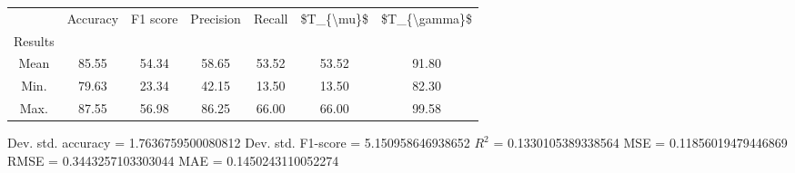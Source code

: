 \begin{tabular}{|c|c|c|c|c|c|c|}
\toprule
{} &  Accuracy &  F1 score &  Precision &  Recall &  \$T\_\{\textbackslash mu\}\$ &  \$T\_\{\textbackslash gamma\}\$ \\
Results &           &           &            &         &            &               \\
\hline
Mean    &     85.55 &     54.34 &      58.65 &   53.52 &      53.52 &         91.80 \\
Min.    &     79.63 &     23.34 &      42.15 &   13.50 &      13.50 &         82.30 \\
Max.    &     87.55 &     56.98 &      86.25 &   66.00 &      66.00 &         99.58 \\
\bottomrule
\end{tabular}

 Dev. std. accuracy = 1.7636759500080812
 Dev. std. F1-score = 5.150958646938652
 $R^2$ = 0.1330105389338564
 MSE = 0.11856019479446869
 RMSE = 0.3443257103303044
 MAE = 0.1450243110052274
